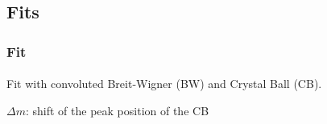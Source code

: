 \subsection{Fits}
\color{titlecolor}
\begin{frame}
  \frametitle{Fit \Zee}
  \framesubtitle{\invMassVarName}

  \framesubtitle{}
  \vspace{10mm}
	Fit with convoluted Breit-Wigner (BW) and Crystal Ball (CB).

  \bl
  $\Delta m$: shift of the peak position of the CB
  

  \dualslide{
  }{  
  }

  \bl
  \centering    \dataSample\xspace \invMassVarName

  
  \begin{block}{}
  \end{block}

\end{frame}


